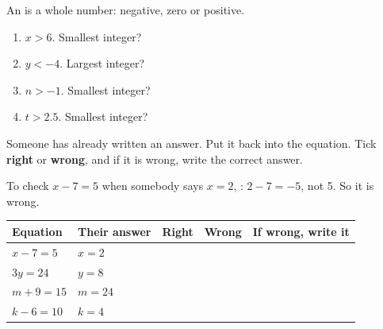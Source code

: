 \documentclass[12pt,a4paper]{article}
\begin{document}

\noindent An  is a whole number: negative, zero or positive.

\vspace{2pt}
\begin{multicols}{2}
\begin{enumerate}[label=(\alph*), itemsep=10pt]
  \item $x > 6$. Smallest integer? \blank[1.8cm]
  \item $y < -4$. Largest integer? \blank[1.8cm]
  \item $n > -1$. Smallest integer? \blank[1.8cm]
  \item $t > 2.5$. Smallest integer? \blank[1.8cm]
\end{enumerate}
\end{multicols}



\noindent Someone has already written an answer. Put it back into the equation. Tick
\textbf{right} or \textbf{wrong}, and if it is wrong, write the correct answer.

\begin{remember}
  To check $x - 7 = 5$ when somebody says $x = 2$, : \;
  $2 - 7 = -5$, not 5. So it is wrong.
\end{remember}

\vspace{2pt}
\noindent
\begin{tabularx}{\textwidth}{|p{3.0cm}|p{2.6cm}|c|c|L|}
  \hline
  \textbf{Equation} & \textbf{Their answer} & \textbf{Right} & \textbf{Wrong} &
  \textbf{If wrong, write it} \\
  \hline
  $x - 7 = 5$ \rule[-0.6em]{0pt}{1.9em}  & $x = 2$  & & & \\ \hline
  $3y = 24$ \rule[-0.6em]{0pt}{1.9em}    & $y = 8$  & & & \\ \hline
  $m + 9 = 15$ \rule[-0.6em]{0pt}{1.9em} & $m = 24$ & & & \\ \hline
  $k - 6 = 10$ \rule[-0.6em]{0pt}{1.9em} & $k = 4$  & & & \\ \hline
\end{tabularx}
\end{document}
